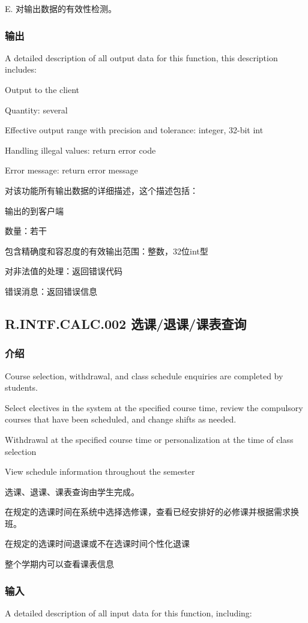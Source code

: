 E.	对输出数据的有效性检测。
\subsubsection{输出}
A detailed description of all output data for this function, this description includes:

Output to the client

Quantity: several

Effective output range with precision and tolerance: integer, 32-bit int

Handling illegal values: return error code

Error message: return error message

对该功能所有输出数据的详细描述，这个描述包括：
		
	输出的到客户端

	数量：若干

	包含精确度和容忍度的有效输出范围：整数，32位int型

	对非法值的处理：返回错误代码
	
	错误消息：返回错误信息

\subsection{R.INTF.CALC.002 选课/退课/课表查询}
\subsubsection{介绍}

Course selection, withdrawal, and class schedule enquiries are completed by students.

Select electives in the system at the specified course time, review the compulsory courses that have been scheduled, and change shifts as needed.

Withdrawal at the specified course time or personalization at the time of class selection

View schedule information throughout the semester

选课、退课、课表查询由学生完成。

在规定的选课时间在系统中选择选修课，查看已经安排好的必修课并根据需求换班。

在规定的选课时间退课或不在选课时间个性化退课

整个学期内可以查看课表信息

\subsubsection{输入}
A detailed description of all input data for this function, including:

